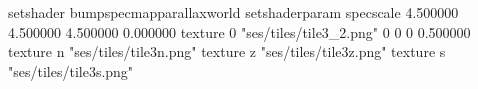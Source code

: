 setshader bumpspecmapparallaxworld
setshaderparam specscale 4.500000 4.500000 4.500000 0.000000
texture 0 "ses/tiles/tile3_2.png" 0 0 0 0.500000
texture n "ses/tiles/tile3n.png"
texture z "ses/tiles/tile3z.png"
texture s "ses/tiles/tile3s.png"

